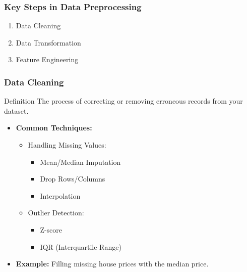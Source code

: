 \documentclass[aspectratio=169]{beamer}
\begin{document}
\begin{frame}
    \frametitle{Key Steps in Data Preprocessing}
    \begin{enumerate}
        \item Data Cleaning
        \item Data Transformation
        \item Feature Engineering
    \end{enumerate}
\end{frame}

\begin{frame}[fragile]
    \frametitle{Data Cleaning}
    \begin{block}{Definition}
        The process of correcting or removing erroneous records from your dataset.
    \end{block}
    \begin{itemize}
        \item \textbf{Common Techniques:}
            \begin{itemize}
                \item Handling Missing Values:
                    \begin{itemize}
                        \item Mean/Median Imputation
                        \item Drop Rows/Columns
                        \item Interpolation
                    \end{itemize}
                \item Outlier Detection:
                    \begin{itemize}
                        \item Z-score
                        \item IQR (Interquartile Range)
                    \end{itemize}
            \end{itemize}
        \item \textbf{Example:} Filling missing house prices with the median price.
    \end{itemize}
\end{frame}
\end{document}
